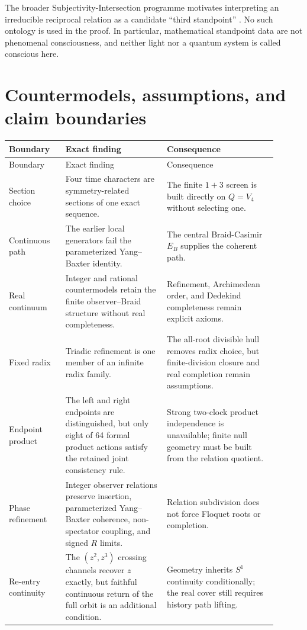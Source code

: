 \documentclass[11pt]{article}
\theoremstyle{definition}
\theoremstyle{remark}
\begin{document}
The broader Subjectivity-Intersection programme motivates interpreting an irreducible reciprocal relation as a candidate ``third standpoint'' \cite{watanabe2026ontology,watanabe2026sim}. No such ontology is used in the proof. In particular, mathematical standpoint data are not phenomenal consciousness, and neither light nor a quantum system is called conscious here.

\section{Countermodels, assumptions, and claim boundaries}

\begin{longtable}{>{\raggedright\arraybackslash}p{0.19\linewidth}>{\raggedright\arraybackslash}p{0.34\linewidth}>{\raggedright\arraybackslash}p{0.37\linewidth}}
\toprule
Boundary & Exact finding & Consequence\\
\midrule
\endfirsthead
\toprule
Boundary & Exact finding & Consequence\\
\midrule
\endhead
Section choice & Four time characters are symmetry-related sections of one exact sequence. & The finite $1+3$ screen is built directly on $Q=V_4$ without selecting one.\\
Continuous path & The earlier local generators fail the parameterized Yang--Baxter identity. & The central Braid-Casimir $E_B$ supplies the coherent path.\\
Real continuum & Integer and rational countermodels retain the finite observer--Braid structure without real completeness. & Refinement, Archimedean order, and Dedekind completeness remain explicit axioms.\\
Fixed radix & Triadic refinement is one member of an infinite radix family. & The all-root divisible hull removes radix choice, but finite-division closure and real completion remain assumptions.\\
Endpoint product & The left and right endpoints are distinguished, but only eight of 64 formal product actions satisfy the retained joint consistency rule. & Strong two-clock product independence is unavailable; finite null geometry must be built from the relation quotient.\\
Phase refinement & Integer observer relations preserve insertion, parameterized Yang--Baxter coherence, non-spectator coupling, and signed $R$ limits. & Relation subdivision does not force Floquet roots or completion.\\
Re-entry continuity & The $(z^2,z^3)$ crossing channels recover $z$ exactly, but faithful continuous return of the full orbit is an additional condition. & Geometry inherits $S^1$ continuity conditionally; the real cover still requires history path lifting.\\

\end{longtable}
\end{document}
